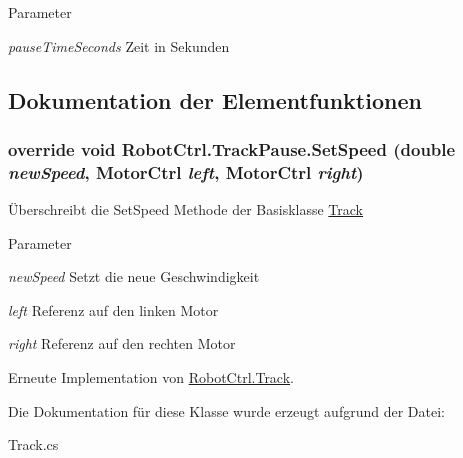 \begin{DoxyParams}{Parameter}
\item[{\em pauseTimeSeconds}]Zeit in Sekunden \end{DoxyParams}


\subsection{Dokumentation der Elementfunktionen}
\hypertarget{class_robot_ctrl_1_1_track_pause_a47133c69e455aa2c04f1bc3a6b5999b6}{
\subsubsection[{SetSpeed}]{\setlength{\rightskip}{0pt plus 5cm}override void RobotCtrl.TrackPause.SetSpeed (double {\em newSpeed}, \/  {\bf MotorCtrl} {\em left}, \/  {\bf MotorCtrl} {\em right})}}
\label{class_robot_ctrl_1_1_track_pause_a47133c69e455aa2c04f1bc3a6b5999b6}
\"{U}berschreibt die SetSpeed Methode der Basisklasse \hyperlink{class_robot_ctrl_1_1_track}{Track}


\begin{DoxyParams}{Parameter}
\item[{\em newSpeed}]Setzt die neue Geschwindigkeit \item[{\em left}]Referenz auf den linken Motor \item[{\em right}]Referenz auf den rechten Motor \end{DoxyParams}


Erneute Implementation von \hyperlink{class_robot_ctrl_1_1_track_a9abc3ccf4bf1d9db8d461f2cb4b4b0d3}{RobotCtrl.Track}.



Die Dokumentation für diese Klasse wurde erzeugt aufgrund der Datei:\begin{DoxyCompactItemize}
\item 
Track.cs\end{DoxyCompactItemize}
